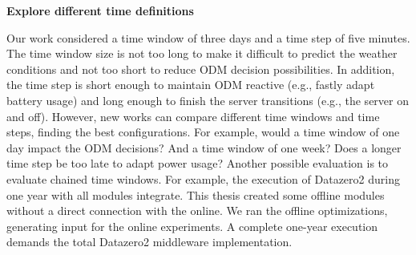 \textbf{Explore different time definitions}

Our work considered a time window of three days and a time step of five minutes. The time window size is not too long to make it difficult to predict the weather conditions and not too short to reduce ODM decision possibilities. In addition, the time step is short enough to maintain ODM reactive (e.g., fastly adapt battery usage) and long enough to finish the server transitions (e.g., the server on and off). However, new works can compare different time windows and time steps, finding the best configurations. For example, would a time window of one day impact the ODM decisions? And a time window of one week? Does a longer time step be too late to adapt power usage? Another possible evaluation is to evaluate chained time windows. For example, the execution of Datazero2 during one year with all modules integrate. This thesis created some offline modules without a direct connection with the online. We ran the offline optimizations, generating input for the online experiments. A complete one-year execution demands the total Datazero2 middleware implementation. 